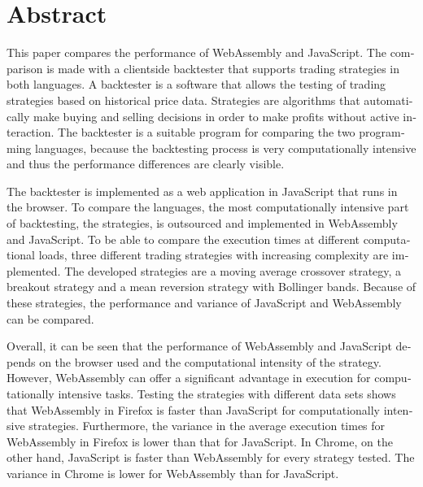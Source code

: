\chapter{Abstract}

\begin{english}
This paper compares the performance of WebAssembly and JavaScript.
The comparison is made with a clientside backtester that supports trading strategies in both languages.
A backtester is a software that allows the testing of trading strategies based on historical price data.
Strategies are algorithms that automatically make buying and selling decisions in order to make profits without active interaction.
The backtester is a suitable program for comparing the two programming languages, because the backtesting process is very computationally intensive and thus the performance differences are clearly visible.
\newline

The backtester is implemented as a web application in JavaScript that runs in the browser.
To compare the languages, the most computationally intensive part of backtesting, the strategies, is outsourced and implemented in WebAssembly and JavaScript.
To be able to compare the execution times at different computational loads, three different trading strategies with increasing complexity are implemented.
The developed strategies are a moving average crossover strategy, a breakout strategy and a mean reversion strategy with Bollinger bands.
Because of these strategies, the performance and variance of JavaScript and WebAssembly can be compared.
\newline

Overall, it can be seen that the performance of WebAssembly and JavaScript depends on the browser used and the computational intensity of the strategy.
However, WebAssembly can offer a significant advantage in execution for computationally intensive tasks.
Testing the strategies with different data sets shows that WebAssembly in Firefox is faster than JavaScript for computationally intensive strategies.
Furthermore, the variance in the average execution times for WebAssembly in Firefox is lower than that for JavaScript.
In Chrome, on the other hand, JavaScript is faster than WebAssembly for every strategy tested.
The variance in Chrome is lower for WebAssembly than for JavaScript.
\end{english}

